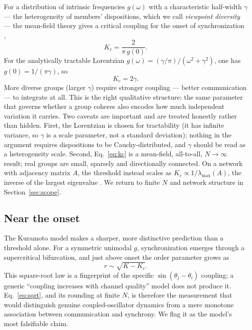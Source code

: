 \documentclass[11pt]{article}
\begin{document}
For a distribution of intrinsic frequencies $g(\omega)$ with a characteristic half-width $\gamma$ --- the heterogeneity of members' dispositions, which we call \emph{viewpoint diversity} --- the mean-field theory gives a critical coupling for the onset of synchronization \citep{kuramoto1984chemical, strogatz2000kuramoto, acebron2005kuramoto},
\begin{equation}
K_c = \frac{2}{\pi\,g(0)}.
\end{equation}
For the analytically tractable Lorentzian $g(\omega) = (\gamma/\pi)/(\omega^2 + \gamma^2)$, one has $g(0) = 1/(\pi\gamma)$, so
\begin{equation}
K_c = 2\gamma.
\label{eq:kc}
\end{equation}
More diverse groups (larger $\gamma$) require stronger coupling --- better communication --- to integrate at all. This is the right qualitative structure: the same parameter that governs whether a group coheres also encodes how much independent variation it carries. Two caveats are important and are treated honestly rather than hidden. First, the Lorentzian is chosen for tractability (it has infinite variance, so $\gamma$ is a scale parameter, not a standard deviation); nothing in the argument requires dispositions to be Cauchy-distributed, and $\gamma$ should be read as a heterogeneity scale. Second, Eq.~\eqref{eq:kc} is a mean-field, all-to-all, $N\to\infty$ result; real groups are small, sparsely and directionally connected. On a network with adjacency matrix $A$, the threshold instead scales as $K_c \propto 1/\lambda_{\max}(A)$, the inverse of the largest eigenvalue \citep{restrepo2005onset}. We return to finite $N$ and network structure in Section~\ref{sec:scope}.

\subsection{Near the onset}

The Kuramoto model makes a sharper, more distinctive prediction than a threshold alone. For a symmetric unimodal $g$, synchronization emerges through a supercritical bifurcation, and just above onset the order parameter grows as \citep{strogatz2000kuramoto, acebron2005kuramoto}
\begin{equation}
r \sim \sqrt{K - K_c}.
\label{eq:sqrt}
\end{equation}
This square-root law is a fingerprint of the specific $\sin(\theta_j-\theta_i)$ coupling; a generic ``coupling increases with channel quality'' model does not produce it. Eq.~\eqref{eq:sqrt}, and its rounding at finite $N$, is therefore the measurement that would distinguish genuine coupled-oscillator dynamics from a mere monotone association between communication and synchrony. We flag it as the model's most falsifiable claim.
\end{document}
